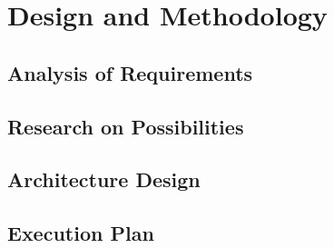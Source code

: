 \chapter{Design and Methodology}

\section{Analysis of Requirements}

\section{Research on Possibilities}

\section{Architecture Design}

\section{Execution Plan}
